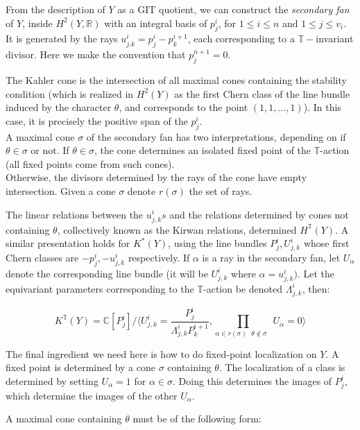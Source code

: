 \documentclass[11pt,letterpaper]{amsart}
\begin{document}
From the description of $Y$ as a GIT quotient, we can construct the \emph{secondary fan} of $Y$, inside $H^2(Y,\mathbb{R})$ with an integral basis of $p^i_j$, for $1\leq i\leq n$ and $1 \leq j\leq v_i$. It is generated by the rays $u^i_{j.k}=p^{i}_j-p^{i+1}_k$, each corresponding to a $\mathbb{T}-$invariant divisor. Here we make the convention that $p^{n+1}_j=0$. 

The Kahler cone is the intersection of all maximal cones containing the stability condition (which is realized in $H^2(Y)$ as the first Chern class of the line bundle induced by the character $\theta$, and corresponds to the point $(1,1,\dots,1)$). In this case, it is precisely the positive span of the $p^i_j$. \\

A maximal cone $\sigma$ of the secondary fan has two interpretations, depending on if $\theta\in \sigma$ or not. If $\theta\in \sigma$, the cone determines an isolated fixed point of the $\mathbb{T}$-action (all fixed points come from such cones). \\

Otherwise, the divisors determined by the rays of the cone have empty intersection. Given a cone $\sigma$ denote $r(\sigma)$ the set of rays. 

The linear relations between the $u^i_{j,k}s$ and the relations determined by cones not containing $\theta$, collectively known as the Kirwan relations, determined $H^\mathbb{T}(Y)$. A similar presentation holds for $K^*(Y)$, using the line bundles $P^i_j, U^i_{j,k}$ whose first Chern classes are $-p^i_j, -u^i_{j,k}$ respectively. If $\alpha$ is a ray in the secondary fan, let $U_\alpha$ denote the corresponding line bundle (it will be $U^{i}_{j,k}$ where $\alpha=u^{i}_{j,k})$. Let the equivariant parameters corresponding to the $\mathbb{T}$-action be denoted $\Lambda^i_{j,k}$, then:

$$K^\mathbb{T}(Y)=\mathbb{C}[P^i_j] / \langle U^{i}_{j,k}=\frac{P^{i}_{j}}{\Lambda^{i}_{j,k}P^{i+1}_k},\prod_{\alpha\in r(\sigma)\text{ $\theta\notin \sigma$ } }U_\alpha=0\rangle$$




The final ingredient we need here is how to do fixed-point localization on $Y$. A fixed point is determined by a cone $\sigma$ containing $\theta$. The localization of a class is determined by setting $U_\alpha=1$ for $\alpha\in \sigma$. Doing this determines the images of $P^{i}_{j}$, which determine the images of the other $U_\alpha$.


A maximal cone containing $\theta$ must be of the following form:
\end{document}
